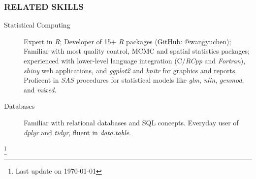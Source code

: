 \documentclass[11pt]{article}
\newcommand{\CPP}
{C\nolinebreak[4]\hspace{0em}\raisebox{.12ex}{\footnotesize\bf ++}}
\begin{document}
	\subsubsection*{\centering RELATED SKILLS}
	\vspace{-.3em}

	\begin{description}
		\item[Statistical Computing] Expert in \emph{R}; Developer of 15+ \emph{R}
		packages (GitHub: \href{https://www.github.com/wangyuchen}{@wangyuchen});
		Familiar with most quality control, MCMC and spatial statistics packages; experienced with lower-level language integration (\CPP{}/\emph{RCpp} and \emph{Fortran}),   \emph{shiny} web applications, and \emph{ggplot2} and \emph{knitr} for graphics and reports. Proficent in \emph{SAS} procedures for statistical models like \emph{glm}, \emph{nlin}, \emph{genmod}, and \emph{mixed}.
		\item[Databases] Familiar with relational databases and SQL concepts. Everyday user of \emph{dplyr} and \emph{tidyr}, fluent in \emph{data.table}.
	\end{description}

\let\thefootnote\relax\footnote{Last update on \today}
\end{document}
